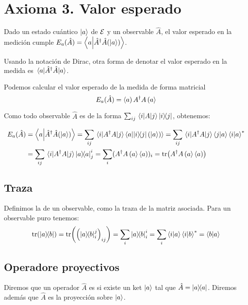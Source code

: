 \section{Axioma 3. Valor esperado}\label{sec:axioma-3.-valor-esperado}
\begin{definition}[Axioma 3]
	Dado un estado cuántico $\ket{a}$ de $\mathcal{E}$ y un observable $\hat{A}$, el valor esperado en la medición cumple $E_a(\hat{A})=\braket{a}{\hat{A}^\dagger\hat{A}(\ket{a})}$.
\end{definition}
Usando la notación de Dirac, otra forma de denotar el valor esperado en la medida es $\ev{\hat{A}^\dagger\hat{A}}{a}$.

Podemos calcular el valor esperado de la medida de forma matricial
\begin{equation}
	\label{eq:valor-esperado-matriz}
	E_a(\hat{A})=\left<a\right)A^\dagger A\left(a\right>
\end{equation}

Como todo observable $\hat{A}$ es de la forma $\sum_{ij}\matrixelement{i}{A}{j}\ketbra{i}{j}$, obtenemos:

\begin{equation}
	\label{eq:valor-esperado}
	\begin{align}
		E_a(\hat{A}) & =\braket{a}{\hat{A}^\dagger \hat{A}(\ket{a})}=\sum_{ij}\matrixelement{i}{A^\dagger A}{j}\braket{a}{\ketbra{i}{j}(\ket{a})}=\sum_{ij}\matrixelement{i}{A^\dagger A}{j}\braket{j}{a}\braket{i}{a}^* \\
		& =\sum_{ij}\matrixelement{i}{A^\dagger A}{j}\ketbramelement{a}{a}{j}{i}=\sum_{i}(A^\dagger A\ketbram{a}{a})_i=\tr(A^\dagger A\ketbram{a}{a})
	\end{align}
\end{equation}

\subsection{Traza}\label{subsec:traza}
Definimos la  de un observable, como la traza de la matriz asociada.
Para un observable puro tenemos:
\begin{equation}
	\label{eq:traza-observable-puro}
	\tr(\ketbra{a}{b})=\tr(\left(\ketbra{a}{b}_{i}^{j}\right)_{ij})=\sum_i\ketbra{a}{b}_{i}^{i}=\sum_i\braket{i}{a}\braket{i}{b}^*=\braket{b}{a}
\end{equation}

\subsection{Operadore proyectivos}\label{subsec:operadore-proyectivos}
Diremos que un operador $\hat{A}$ es  si existe un ket $\ket{a}$ tal que $\hat{A}=\ketbra{a}{a}$.
Diremos además que $\hat{A}$ es la proyección sobre $\ket{a}$.

